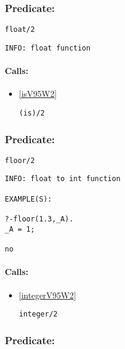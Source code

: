 \subsubsection{Predicate:} \label{floatV95W2}

\begin{verbatim}
float/2
\end{verbatim}

{\small \begin{verbatim}
INFO: float function

\end{verbatim}}
\paragraph{Calls:} 
\begin{itemize}
\item \ref{isV95W2} 
\begin{verbatim}
(is)/2
\end{verbatim}

\end{itemize}

\subsubsection{Predicate:} \label{floorV95W2}

\begin{verbatim}
floor/2
\end{verbatim}

{\small \begin{verbatim}
INFO: float to int function

EXAMPLE(S):

?-floor(1.3,_A).
_A = 1;

no

\end{verbatim}}
\paragraph{Calls:} 
\begin{itemize}
\item \ref{integerV95W2} 
\begin{verbatim}
integer/2
\end{verbatim}

\end{itemize}

\subsubsection{Predicate:} \label{flushV95WoutputV95W0}

